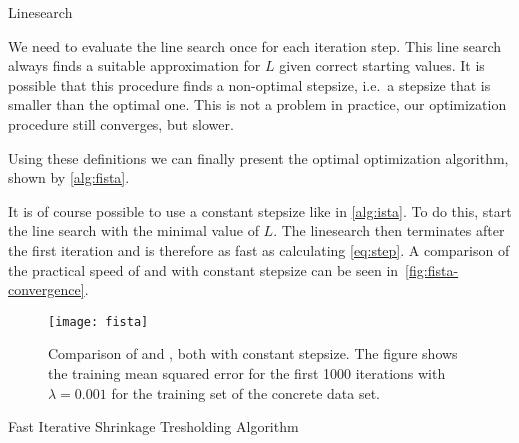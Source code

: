 \begin{algorithm}[H]
 \caption{Linesearch}\label{alg:linesearch}
 \begin{algorithmic}[1]
  \Statex
    \Do
    \State {} 
  \EndFunction
 \end{algorithmic}
\end{algorithm}

We need to evaluate the line search once for each iteration step.
This line search always finds a suitable approximation for \(L\) given correct
starting values.
It is possible that this procedure finds a non-optimal stepsize, i.e.~a
stepsize that is smaller than the optimal one.
This is not a problem in practice, our optimization procedure still converges,
but slower. 

Using these definitions we can finally present the optimal optimization
algorithm, shown by \autoref{alg:fista}.

It is of course possible to use a constant stepsize like in \autoref{alg:ista}.
To do this, start the line search with the minimal value of \(L\).
The linesearch then terminates after the first iteration and is therefore as fast as calculating \autoref{eq:step}.
A comparison of the practical speed of \ista and \fista with constant stepsize can be seen in~\autoref{fig:fista-convergence}.
\begin{figure}[T]
  \texttt{[image: fista]}
  \caption{Comparison of \fista and \ista, both with constant stepsize.
    The figure shows the training mean squared error for the first 1000 iterations with \(\lambda = 0.001\) for the training set of the concrete data set.}\label{fig:fista-convergence}
\end{figure}

\begin{algorithm}[H]
 \caption{Fast Iterative Shrinkage Tresholding Algorithm} \label{alg:fista} 
 \begin{algorithmic}[1]
    \Statex
     
         
      \EndWhile
     \State \Return{\(\bm{\alpha}\)}
    \EndFunction
\end{algorithmic}
\end{algorithm}

